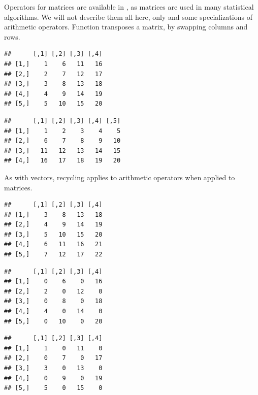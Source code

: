 \documentclass[krantz2]{krantz}\usepackage{knitr}%
\begin{document}
Operators for matrices are available in \Rlang, as matrices are used in many statistical algorithms. We will not describe them all here, only  and some specializations of arithmetic operators. Function  transposes a matrix, by swapping columns and rows.

\begin{knitrout}\footnotesize
{}\color{fgcolor}\begin{kframe}
\begin{alltt}
 \hlkwb{<-} \hlstd{(}\hlopt{:}\hlstd{,}  \hlstd{=} \hlstd{)}
\end{alltt}
\begin{verbatim}
##      [,1] [,2] [,3] [,4]
## [1,]    1    6   11   16
## [2,]    2    7   12   17
## [3,]    3    8   13   18
## [4,]    4    9   14   19
## [5,]    5   10   15   20
\end{verbatim}
\begin{alltt}
\end{alltt}
\begin{verbatim}
##      [,1] [,2] [,3] [,4] [,5]
## [1,]    1    2    3    4    5
## [2,]    6    7    8    9   10
## [3,]   11   12   13   14   15
## [4,]   16   17   18   19   20
\end{verbatim}
\end{kframe}
\end{knitrout}

As with vectors, recycling applies to arithmetic operators when applied to matrices.

\begin{knitrout}\footnotesize
{}\color{fgcolor}\begin{kframe}
\begin{alltt}
 \hlopt{+} 
\end{alltt}
\begin{verbatim}
##      [,1] [,2] [,3] [,4]
## [1,]    3    8   13   18
## [2,]    4    9   14   19
## [3,]    5   10   15   20
## [4,]    6   11   16   21
## [5,]    7   12   17   22
\end{verbatim}
\begin{alltt}
 \hlopt{*} \hlopt{:}
\end{alltt}
\begin{verbatim}
##      [,1] [,2] [,3] [,4]
## [1,]    0    6    0   16
## [2,]    2    0   12    0
## [3,]    0    8    0   18
## [4,]    4    0   14    0
## [5,]    0   10    0   20
\end{verbatim}
\begin{alltt}
 \hlopt{*} \hlopt{:}
\end{alltt}
\begin{verbatim}
##      [,1] [,2] [,3] [,4]
## [1,]    1    0   11    0
## [2,]    0    7    0   17
## [3,]    3    0   13    0
## [4,]    0    9    0   19
## [5,]    5    0   15    0
\end{verbatim}
\end{kframe}
\end{knitrout}
\end{document}
